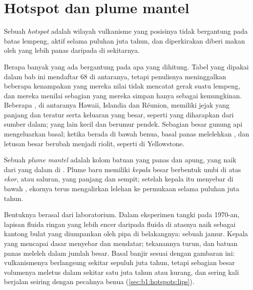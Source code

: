 \section{Hotspot dan plume mantel}\label{sec:b1:hotspots:plumes}

\begin{definition}\label{def:b1:hotspots:hotspot}
Sebuah \emph{hotspot} adalah wilayah vulkanisme yang posisinya tidak bergantung pada batas lempeng, aktif selama puluhan juta tahun, dan diperkirakan diberi makan oleh  yang lebih panas daripada  di sekitarnya.
\end{definition}

Berapa banyak  yang ada bergantung pada apa yang dihitung. Tabel  yang dipakai dalam bab ini mendaftar 68 di antaranya, tetapi penulisnya meninggalkan beberapa kenampakan yang mereka nilai tidak mencatat gerak suatu lempeng, dan mereka menilai sebagian yang mereka simpan hanya sebagai kemungkinan. Beberapa , di antaranya Hawaii, Islandia dan Réunion, memiliki jejak yang panjang dan teratur serta keluaran yang besar, seperti yang diharapkan dari sumber dalam; yang lain kecil dan berumur pendek. Sebagian besar gunung api  mengeluarkan basal; ketika  berada di bawah benua, basal panas melelehkan , dan letusan besar berubah menjadi riolit, seperti di Yellowstone.

\begin{definition}\label{def:b1:hotspots:plume}
Sebuah \emph{plume mantel} adalah kolom batuan  yang panas dan apung, yang naik dari  yang dalam di . Plume baru memiliki \emph{kepala} besar berbentuk umbi di atas \emph{ekor}, atau saluran, yang panjang dan sempit; setelah kepala itu menyebar di bawah , ekornya terus mengalirkan lelehan ke permukaan selama puluhan juta tahun.
\end{definition}

Bentuknya berasal dari laboratorium. Dalam eksperimen tangki pada 1970-an, lapisan fluida ringan yang lebih encer daripada fluida di atasnya naik sebagai kantong bulat yang diumpankan oleh pipa di belakangnya: sebuah jamur. Kepala  yang mencapai dasar  menyebar dan mendatar; tekanannya turun, dan batuan panas meleleh dalam jumlah besar. Basal banjir sesuai dengan gambaran ini: vulkanismenya berlangsung sekitar sepuluh juta tahun, tetapi sebagian besar volumenya meletus dalam sekitar satu juta tahun atau kurang, dan sering kali berjalan seiring dengan pecahnya benua (\cref{sec:b1:hotspots:lips}).

